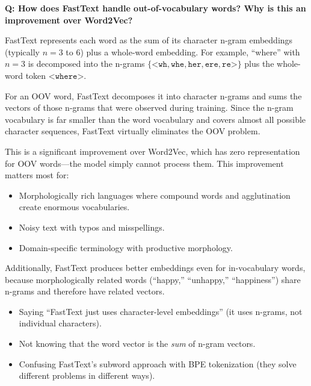 \begin{interviewq}
\textbf{Q: How does FastText handle out-of-vocabulary words? Why is this
an improvement over Word2Vec?}

 \quad {} \quad \badgefreq{\freqmed}

\stronganswer
FastText represents each word as the sum of its character n-gram embeddings
(typically $n = 3$ to $6$) plus a whole-word embedding.  For example,
``where'' with $n=3$ is decomposed into the n-grams
$\{\texttt{<wh}, \texttt{whe}, \texttt{her}, \texttt{ere},
\texttt{re>}\}$ plus the whole-word token $\texttt{<where>}$.

For an OOV word, FastText decomposes it into character n-grams and sums the
vectors of those n-grams that were observed during training.  Since the
n-gram vocabulary is far smaller than the word vocabulary and covers
almost all possible character sequences, FastText virtually eliminates the
OOV problem.

This is a significant improvement over Word2Vec, which has zero representation
for OOV words---the model simply cannot process them.  This improvement
matters most for:
\begin{itemize}
    \item Morphologically rich languages where compound words and
    agglutination create enormous vocabularies.
    \item Noisy text with typos and misspellings.
    \item Domain-specific terminology with productive morphology.
\end{itemize}

Additionally, FastText produces better embeddings even for in-vocabulary
words, because morphologically related words (``happy,'' ``unhappy,''
``happiness'') share n-grams and therefore have related vectors.

\redflags
\begin{itemize}
    \item Saying ``FastText just uses character-level embeddings'' (it uses
    n-grams, not individual characters).
    \item Not knowing that the word vector is the \emph{sum} of n-gram
    vectors.
    \item Confusing FastText's subword approach with BPE tokenization (they
    solve different problems in different ways).
\end{itemize}



\end{interviewq}
